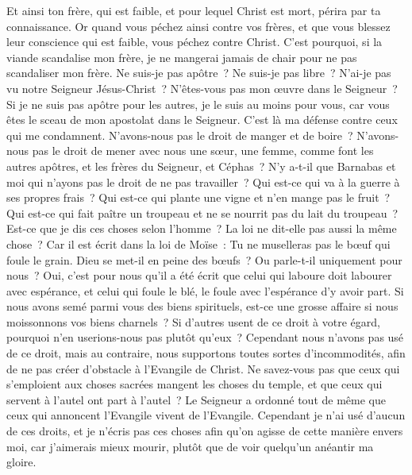 \begin{multicols}{2}
Et ainsi ton frère, qui est faible, et pour lequel Christ est mort, périra par ta connaissance.
Or quand vous péchez ainsi contre vos frères, et que vous blessez leur conscience qui est faible, vous péchez contre Christ.
C'est pourquoi, si la viande scandalise mon frère, je ne mangerai jamais de chair pour ne pas scandaliser mon frère.
\VerseOne{}Ne suis-je pas apôtre~? Ne suis-je pas libre~? N'ai-je pas vu notre Seigneur Jésus-Christ~? N'êtes-vous pas mon œuvre dans le Seigneur~?
Si je ne suis pas apôtre pour les autres, je le suis au moins pour vous, car vous êtes le sceau de mon apostolat dans le Seigneur.
C'est là ma défense contre ceux qui me condamnent.
N'avons-nous pas le droit de manger et de boire~?
N'avons-nous pas le droit de mener avec nous une sœur, une femme, comme font les autres apôtres, et les frères du Seigneur, et Céphas~?
N'y a-t-il que Barnabas et moi qui n'ayons pas le droit de ne pas travailler~?
Qui est-ce qui va à la guerre à ses propres frais~? Qui est-ce qui plante une vigne et n'en mange pas le fruit~? Qui est-ce qui fait paître un troupeau et ne se nourrit pas du lait du troupeau~?
Est-ce que je dis ces choses selon l'homme~? La loi ne dit-elle pas aussi la même chose~?
Car il est écrit dans la loi de Moïse~: Tu ne muselleras pas le bœuf qui foule le grain. Dieu se met-il en peine des bœufs~?
Ou parle-t-il uniquement pour nous~? Oui, c'est pour nous qu'il a été écrit que celui qui laboure doit labourer avec espérance, et celui qui foule le blé, le foule avec l'espérance d'y avoir part.
Si nous avons semé parmi vous des biens spirituels, est-ce une grosse affaire si nous moissonnons vos biens charnels~?
Si d'autres usent de ce droit à votre égard, pourquoi n'en userions-nous pas plutôt qu'eux~? Cependant nous n'avons pas usé de ce droit, mais au contraire, nous supportons toutes sortes d'incommodités, afin de ne pas créer d'obstacle à l'Evangile de Christ.
Ne savez-vous pas que ceux qui s'emploient aux choses sacrées mangent les choses du temple, et que ceux qui servent à l'autel ont part à l'autel~?
Le Seigneur a ordonné tout de même que ceux qui annoncent l'Evangile vivent de l'Evangile.
Cependant je n'ai usé d'aucun de ces droits, et je n'écris pas ces choses afin qu'on agisse de cette manière envers moi, car j'aimerais mieux mourir, plutôt que de voir quelqu'un anéantir ma gloire.

\end{multicols}
